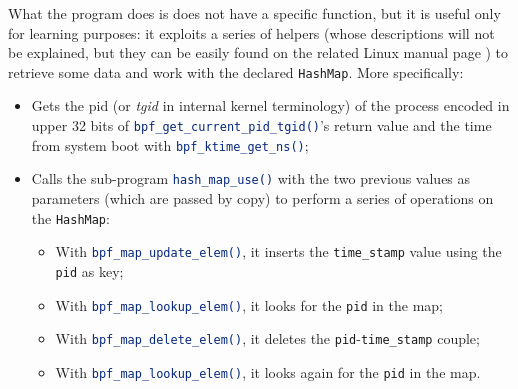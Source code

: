 What the program does is does not have a specific function, but it is useful only for learning purposes: it exploits a series of helpers (whose descriptions will not be explained, but they can be easily found on the related Linux manual page \cite{LinuxHelpers}) to retrieve some data and work with the declared \colorbox{backcolour}{\lstinline[style=commandline, language=bash, breaklines=true]|HashMap|}.
More specifically:

\begin{itemize}
	\item 
		Gets the pid (or \textit{tgid} in internal kernel terminology) of the process encoded in upper 32 bits of \colorbox{backcolour}{\lstinline[style=commandline, language=bash, breaklines=true]|bpf_get_current_pid_tgid()|}'s return value and the time from system boot with \colorbox{backcolour}{\lstinline[style=commandline, language=bash, breaklines=true]|bpf_ktime_get_ns()|};
	\item 
		Calls the sub-program \colorbox{backcolour}{\lstinline[style=commandline, language=bash, breaklines=true]|hash_map_use()|} with the two previous values as parameters (which are passed by copy) to perform a series of operations on the \colorbox{backcolour}{\lstinline[style=commandline, language=bash, breaklines=true]|HashMap|}:
		\begin{itemize}
			\item 
				With \colorbox{backcolour}{\lstinline[style=commandline, language=bash, breaklines=true]|bpf_map_update_elem()|}, it inserts the \colorbox{backcolour}{\lstinline[style=commandline, language=bash, breaklines=true]|time_stamp|} value using the \colorbox{backcolour}{\lstinline[style=commandline, language=bash, breaklines=true]|pid|} as key;
			\item 
				With \colorbox{backcolour}{\lstinline[style=commandline, language=bash, breaklines=true]|bpf_map_lookup_elem()|}, it looks for the \colorbox{backcolour}{\lstinline[style=commandline, language=bash, breaklines=true]|pid|} in the map;
			\item 
				With \colorbox{backcolour}{\lstinline[style=commandline, language=bash, breaklines=true]|bpf_map_delete_elem()|}, it deletes the \colorbox{backcolour}{\lstinline[style=commandline, language=bash, breaklines=true]|pid|}-\colorbox{backcolour}{\lstinline[style=commandline, language=bash, breaklines=true]|time_stamp|} couple;
			\item 
				With \colorbox{backcolour}{\lstinline[style=commandline, language=bash, breaklines=true]|bpf_map_lookup_elem()|}, it looks again for the \colorbox{backcolour}{\lstinline[style=commandline, language=bash, breaklines=true]|pid|} in the map.
		\end{itemize}
\end{itemize}

